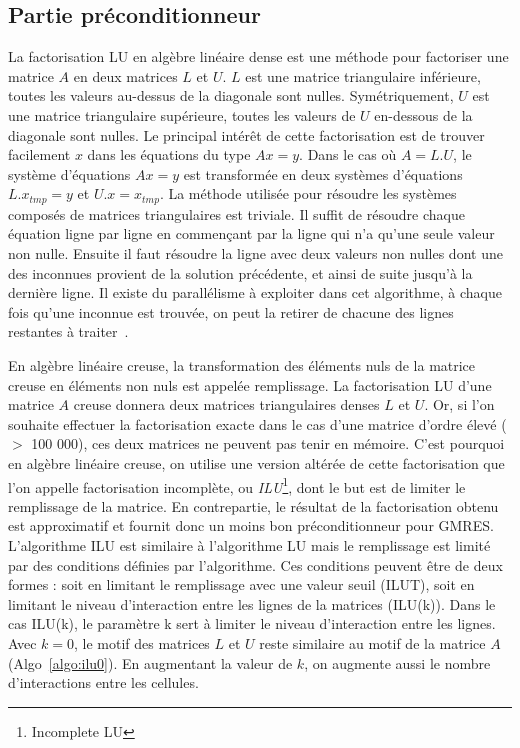 \subsection{Partie préconditionneur}
La factorisation LU en algèbre linéaire dense est une méthode pour factoriser une matrice $A$ en deux matrices $L$ et $U$.
%
$L$ est une matrice triangulaire inférieure, toutes les valeurs au-dessus de la diagonale sont nulles.
%
Symétriquement, $U$ est une matrice triangulaire supérieure, toutes les valeurs de $U$ en-dessous de la diagonale sont nulles.
%
Le principal intérêt de cette factorisation est de trouver facilement $x$ dans les équations du type $Ax=y$.
%
Dans le cas où $A=L.U$, le système d'équations $Ax=y$ est transformée en deux systèmes d'équations $L.x_{tmp}=y$ et $U.x=x_{tmp}$.
%
La méthode utilisée pour résoudre les systèmes composés de matrices triangulaires est triviale.
%
Il suffit de résoudre chaque équation ligne par ligne en commençant par la ligne qui n'a qu'une seule valeur non nulle.
%
Ensuite il faut résoudre la ligne avec deux valeurs non nulles dont une des inconnues provient de la solution précédente, et ainsi de suite jusqu'à la dernière ligne.
%
Il existe du parallélisme à exploiter dans cet algorithme, à chaque fois qu'une inconnue est trouvée, on peut la retirer de chacune des lignes restantes à traiter~\cite{plasma_lu}.



En algèbre linéaire creuse, la transformation des éléments nuls de la matrice creuse en éléments non nuls est appelée remplissage.
%
La factorisation LU d'une matrice $A$ creuse donnera deux matrices triangulaires denses $L$ et $U$.
%
Or, si l'on souhaite effectuer la factorisation exacte dans le cas d'une matrice d'ordre élevé ($>$ 100 000), ces deux matrices ne peuvent pas tenir en mémoire.
%
C'est pourquoi en algèbre linéaire creuse, on utilise une version altérée de cette factorisation que l'on appelle factorisation incomplète, ou {\em ILU}\footnote{Incomplete LU}, dont le but est de limiter le remplissage de la matrice.
%
En contrepartie, le résultat de la factorisation obtenu est approximatif et fournit donc un moins bon préconditionneur pour GMRES.
%
L'algorithme ILU est similaire à l'algorithme LU mais le remplissage est limité par des conditions définies par l'algorithme.
%
Ces conditions peuvent être de deux formes : soit en limitant le remplissage avec une valeur seuil (ILUT\cite{saad1994ilut}), soit en limitant le niveau d'interaction entre les lignes de la matrices (ILU(k)).
%
Dans le cas ILU(k), le paramètre k sert à limiter le niveau d'interaction entre les lignes.
%
Avec $k=0$, le motif des matrices $L$ et $U$ reste similaire au motif de la matrice $A$ (Algo~\ref{algo:ilu0}).
%
En augmentant la valeur de $k$, on augmente aussi le nombre d'interactions entre les cellules.





